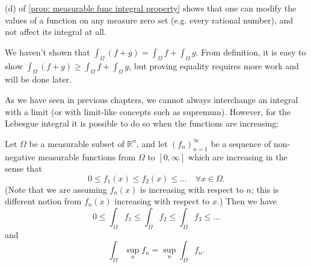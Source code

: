 \begin{remark}
    (d) of \autoref{prop: measurable func integral property} shows that one can modify the values of a function on any measure zero set (e.g. every rational number), and not affect its integral at all.
\end{remark}

\begin{remark}
    We haven't shown that \(\int _\Omega (f + g) = \int _\Omega f + \int _\Omega g\). From definition, it is easy to show \(\int _\Omega (f + g) \ge \int _\Omega f + \int _\Omega g\), but proving equality requires more work and will be done later.  
\end{remark}

As we have seen in previous chapters, we cannot always interchange an integral with a limit (or with limit-like concepts such as supremum). However, for the Lebesgue integral it is possible to do so when the functions are increasing:

\begin{theorem}
    Let \(\Omega\) be a measurable subset of \(\mathbb{R} ^n\), and let \((f_n)_{n=1}^{\infty} \) be a sequence of non-negative measurable functions from \(\Omega\) to \([0, \infty]\) which are increasing in the sense that 
    \[
        0 \le f_1(x) \le f_2(x) \le \dots \quad \forall x \in \Omega. 
    \]     
    (Note that we are assuming \(f_n(x)\) is increasing with respect to \(n\); this is different notion from \(f_n(x)\) increasing with respect to \(x\).) Then we have 
    \[
        0 \le \int _\Omega f_1 \le \int _\Omega f_2 \le \int _\Omega f_3 \le \dots 
    \]
    and 
    \[
    \int _\Omega \sup _n f_n = \sup _n \int _\Omega f_n.
    \]
\end{theorem}


